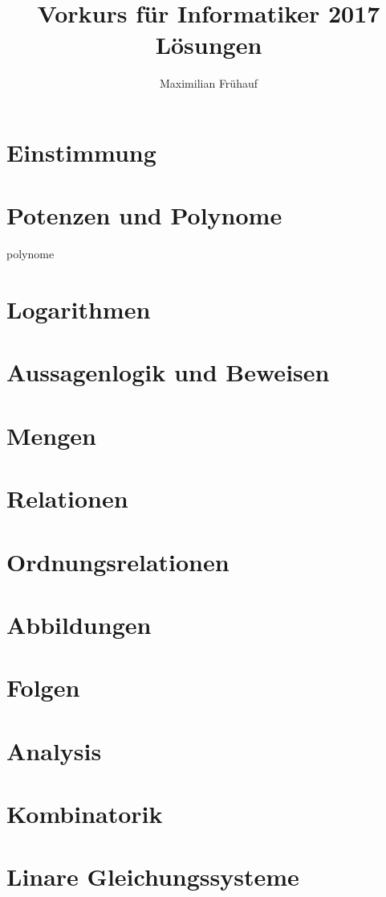 \documentclass[a4paper, 11pt]{article}
\title{Vorkurs für Informatiker 2017 Lösungen}
\author{Maximilian Frühauf}
\begin{document}
\maketitle

\section{Einstimmung}

\section{Potenzen und Polynome}
{polynome}

\section{Logarithmen}

\section{Aussagenlogik und Beweisen}

\section{Mengen}

\section{Relationen}

\section{Ordnungsrelationen}

\section{Abbildungen}

\section{Folgen}

\section{Analysis}

\section{Kombinatorik}

\section{Linare Gleichungssysteme}
\end{document}
